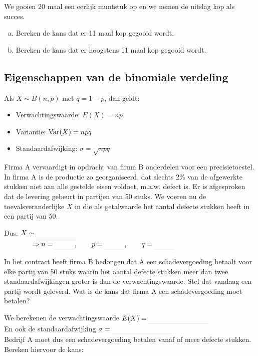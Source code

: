 \documentclass[12pt,twoside]{article}
\begin{document}
\begin{oefening}
We gooien 20 maal een eerlijk muntstuk op en we nemen de uitslag kop als succes.
\begin{enumerate}[(a)]
  \item Bereken de kans dat er 11 maal kop gegooid wordt.
  \item Bereken de kans dat er hoogstens 11 maal kop gegooid wordt.
\end{enumerate}
\end{oefening}

\subsection{Eigenschappen van de binomiale verdeling}

\begin{mdframed}
Als $X \sim B(n,p)$ met $q=1-p$, dan geldt:
\begin{itemize}
  \item Verwachtingswaarde: $E(X)=np$
  \item Variantie: $\Var(X)=npq$
  \item Standaardafwijking: $\sigma = \sqrt{npq}$
\end{itemize}
\end{mdframed}

\begin{oefening}
Firma A vervaardigt in opdracht van firma B onderdelen voor een precisietoestel. In firma A is de productie zo georganiseerd, dat slechts 2\% van de afgewerkte stukken niet aan alle gestelde eisen voldoet, m.a.w. defect is.
Er is afgesproken dat de levering gebeurt in partijen van 50 stuks. We voeren nu de toevalsveranderlijke $X$ in die als getalwaarde het aantal defecte stukken heeft in een partij van 50.

Dus: $X\sim\arule{2cm}$\\
$\qquad\qquad\Rightarrow  n=\arule{1cm}, \qquad p=\arule{1cm}, \qquad q=\arule{1cm}$

In het contract heeft firma B bedongen dat A een schadevergoeding betaalt voor elke partij van 50 stuks waarin het aantal defecte stukken meer dan twee standaardafwijkingen groter is dan de verwachtingswaarde. Stel dat vandaag een partij wordt geleverd. Wat is de kans dat firma A een schadevergoeding moet betalen?

We berekenen de verwachtingswaarde $E(X)=\arule{3cm}$\\
En ook de standaardafwijking $\sigma=\arule{3cm}$\\
Bedrijf A moet dus een schadevergoeding betalen vanaf \arule{1cm} of meer defecte stukken.\\
Bereken hiervoor de kans:
\end{oefening}
\end{document}
